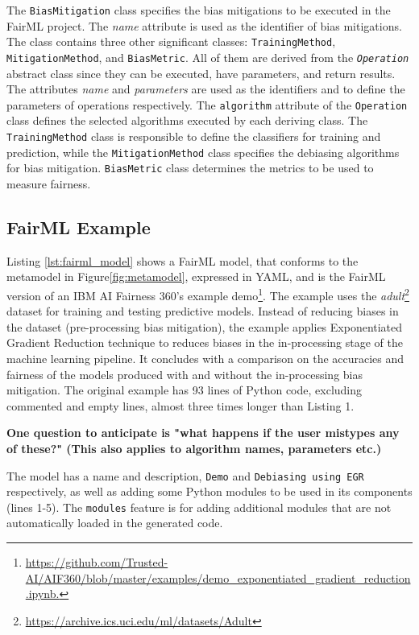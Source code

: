 \documentclass[sigconf,review]{acmart}
\begin{document}
{	The \texttt{BiasMitigation} class specifies the bias mitigations to be executed in the FairML project. The \textit{name} attribute is used as the identifier of bias mitigations. The class contains three other significant classes: \texttt{TrainingMethod}, \texttt{MitigationMethod}, and \texttt{BiasMetric}. All of them are derived from the \texttt{\textit{Operation}} abstract class since they can be executed, have parameters, and return results. The attributes \textit{name} and \textit{parameters} are used as the identifiers and to define the parameters of operations respectively. The \texttt{algorithm} attribute of the \texttt{Operation} class defines the selected algorithms executed by each deriving class. The \texttt{TrainingMethod} class is responsible to define the classifiers for training and prediction, while the \texttt{MitigationMethod} class specifies the debiasing algorithms for bias mitigation. \texttt{BiasMetric} class determines the metrics to be used to measure fairness. 
	
	\subsection{FairML Example}
	\label{sec:fairml_example}	
	Listing \ref{lst:fairml_model} shows a FairML model, that conforms to the metamodel in Figure\ref{fig:metamodel}, expressed in YAML, and is the FairML version of an IBM AI Fairness 360's example demo\footnote{\url{https://github.com/Trusted-AI/AIF360/blob/master/examples/demo_exponentiated_gradient_reduction.ipynb.}}. 	
	The example uses the \textit{adult}\footnote{\url{https://archive.ics.uci.edu/ml/datasets/Adult}} dataset for training and testing predictive models. Instead of reducing biases in the dataset (pre-processing bias mitigation), the example applies Exponentiated Gradient Reduction technique to reduces biases in the in-processing stage of the machine learning pipeline. It concludes with a comparison on the accuracies and fairness of the models produced with and without the in-processing bias mitigation. The original example has 93 lines of Python code, excluding commented and empty lines, almost three times longer than Listing 1.
	
	\textbf{One question to anticipate is "what happens if the user mistypes any of these?" (This also applies to algorithm names, parameters etc.)}
	
	The model has a name and description, \texttt{Demo} and \texttt{Debiasing using EGR} respectively, as well as adding some Python modules to be used in its components (lines 1-5). 
	The \texttt{modules} feature is for adding additional modules that are not automatically loaded in the generated code. 
	
}
\end{document}
